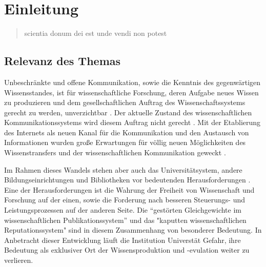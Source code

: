 \chapter{Einleitung} 

\begin{quote}
scientia donum dei est unde vendi non potest
\end{quote}

\section{Relevanz des Themas} 

Unbeschränkte und offene Kommunikation, sowie die Kenntnis des gegenwärtigen Wissensstandes, ist für wissenschaftliche Forschung, deren Aufgabe neues Wissen zu produzieren und dem gesellschaftlichen Auftrag des Wissenschaftssystems gerecht zu werden, unverzichtbar \cite{Hanekop_2014} \cite{glaeser2006} \cite{gibbons_1994} \cite{Luhmann1998}. Der aktuelle Zustand des wissenschaftlichen Kommunikationssystems wird diesem Auftrag nicht gerecht \cite{Schekman_2013}. Mit der Etablierung des Internets als neuen Kanal für die Kommunikation und den Austausch von Informationen wurden große Erwartungen für völlig neuen Möglichkeiten des Wissenstransfers und der wissenschaftlichen Kommunikation geweckt \cite{Hanekop_2014} \cite{schulze_2013_open} \cite{albert_2006_open_implications} \cite{Goodrum_2001} \cite{Lawrence_1999}.

Im Rahmen dieses Wandels stehen aber auch das Universitätsystem, andere Bildungseinrichtungen und Bibliotheken vor bedeutenden Herausforderungen \cite{Harter2006} \cite{Gu_don_2004} \cite{osterloh2008anreize}. Eine der Herausforderungen ist die Wahrung der Freiheit von Wissenschaft und Forschung auf der einen, sowie die Forderung nach besseren Steuerungs- und Leistungsprozessen \cite{Adler_2009} \cite{gibbons_1994} auf der anderen Seite. Die “gestörten Gleichgewichte im wissenschaftlichen Publikationssystem” \cite{cite:0} und das "kaputten wissenschaftlichen Reputationssystem" \cite{suchen} sind in diesem Zusammenhang von besonderer Bedeutung. In Anbetracht dieser Entwicklung läuft die Institution Universtät Gefahr, ihre Bedeutung als exklusiver Ort der Wissensproduktion \cite{suchen} und -evulation \cite{suchen} weiter zu verlieren.

